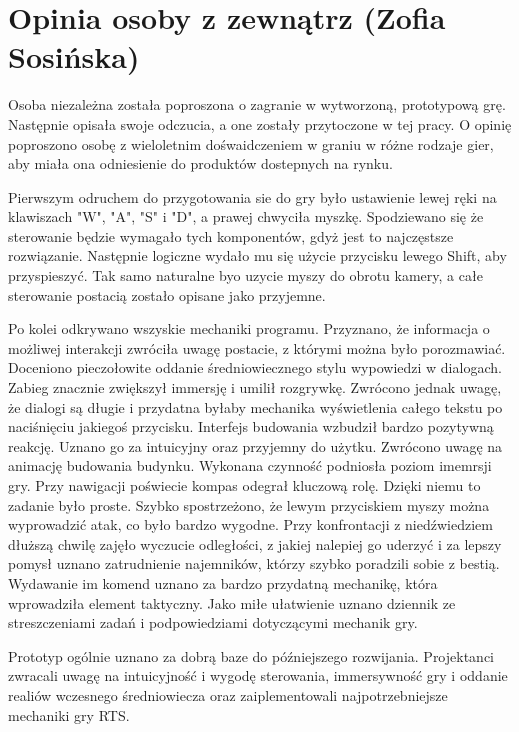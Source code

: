 \section{Opinia osoby z zewnątrz (Zofia Sosińska)}
Osoba niezależna została poproszona o zagranie w wytworzoną, prototypową grę. Następnie opisała swoje odczucia, a one zostały przytoczone 
w tej pracy. O opinię poproszono osobę z wieloletnim dośwaidczeniem w graniu w różne rodzaje gier, aby miała ona odniesienie do produktów
dostepnych na rynku.

Pierwszym odruchem do przygotowania sie do gry było ustawienie lewej ręki na klawiszach "W", "A", "S" i "D", a prawej chwyciła myszkę. Spodziewano się 
że sterowanie będzie wymagało tych komponentów, gdyż jest to najczęstsze rozwiązanie. Następnie logiczne wydało mu się użycie przycisku lewego Shift, aby przyspieszyć. 
Tak samo naturalne byo uzycie myszy do obrotu kamery, a całe sterowanie postacią zostało opisane jako przyjemne.

Po kolei odkrywano wszyskie mechaniki programu. Przyznano, że informacja o możliwej interakcji zwróciła uwagę postacie, z którymi można było porozmawiać. 
Doceniono pieczołowite oddanie średniowiecznego stylu wypowiedzi w dialogach. Zabieg znacznie zwiększył immersję i umilił rozgrywkę. Zwrócono jednak uwagę,
że dialogi są długie i przydatna byłaby mechanika wyświetlenia całego tekstu po naciśnięciu jakiegoś przycisku. Interfejs budowania wzbudził bardzo pozytywną reakcję.
Uznano go za intuicyjny oraz przyjemny do użytku. Zwrócono uwagę na animację budowania budynku. Wykonana czynność podniosła poziom imemrsji gry. Przy nawigacji poświecie
kompas odegrał kluczową rolę. Dzięki niemu to zadanie było proste. Szybko spostrzeżono, że lewym przyciskiem myszy można wyprowadzić atak, co było bardzo wygodne. 
Przy konfrontacji z niedźwiedziem dłuższą chwilę zajęło wyczucie odległości, z jakiej nalepiej go uderzyć i za lepszy pomysł uznano zatrudnienie najemników, którzy szybko poradzili
sobie z bestią. Wydawanie im komend uznano za bardzo przydatną mechanikę, która wprowadziła element taktyczny. Jako miłe ułatwienie uznano dziennik ze streszczeniami zadań i 
podpowiedziami dotyczącymi mechanik gry.

Prototyp ogólnie uznano za dobrą baze do późniejszego rozwijania. Projektanci zwracali uwagę na intuicyjność i wygodę sterowania, immersywność gry i oddanie realiów wczesnego średniowiecza
oraz zaiplementowali najpotrzebniejsze mechaniki gry RTS. 
